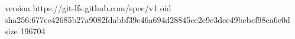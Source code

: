 version https://git-lfs.github.com/spec/v1
oid sha256:677ee42685b27a9082fdabbf39c46a694d28845ce2e9e3dee49bcbcf98ea6e0d
size 196704
